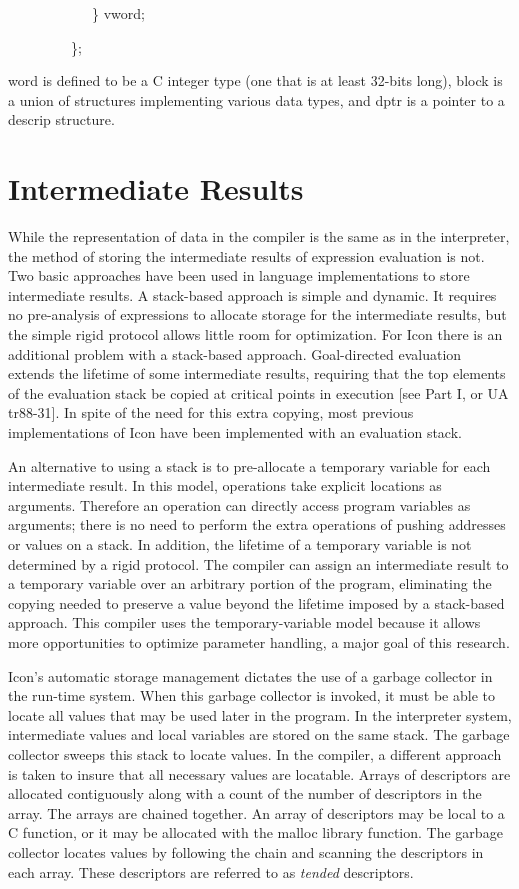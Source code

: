{\ttfamily\mdseries
\ \ \ \ \ \ \ \ \ \ \ \ \} vword;}

{\ttfamily\mdseries
\ \ \ \ \ \ \ \ \ \};}


word is defined to be a C integer type (one that is at least 32-bits long), block is a union of structures implementing
various data types, and dptr is a pointer to a descrip structure. 

\section{Intermediate Results}

While the representation of data in the compiler is the same as in the
interpreter, the method of storing the intermediate results of
expression evaluation is not. Two basic approaches have been used in
language implementations to store intermediate results. A stack-based
approach is simple and dynamic. It requires no pre-analysis of
expressions to allocate storage for the intermediate results, but the
simple rigid protocol allows little room for optimization.  For Icon
there is an additional problem with a stack-based
approach. Goal-directed evaluation extends the lifetime of some
intermediate results, requiring that the top elements of the
evaluation stack be copied at critical points in execution [see Part
I, or UA tr88-31]. In spite of the need for this extra copying, most
previous implementations of Icon have been implemented with an
evaluation stack.

An alternative to using a stack is to pre-allocate a temporary
variable for each intermediate result. In this model, operations take
explicit locations as arguments. Therefore an operation can directly
access program variables as arguments; there is no need to perform the
extra operations of pushing addresses or values on a stack. In
addition, the lifetime of a temporary variable is not determined by a
rigid protocol. The compiler can assign an intermediate result to a
temporary variable over an arbitrary portion of the program,
eliminating the copying needed to preserve a value beyond the lifetime
imposed by a stack-based approach. This compiler uses the
temporary-variable model because it allows more opportunities to
optimize parameter handling, a major goal of this research.


Icon's automatic storage management dictates the use of a garbage
collector in the run-time system. When this garbage collector is
invoked, it must be able to locate all values that may be used later
in the program. In the interpreter system, intermediate values and
local variables are stored on the same stack. The garbage collector
sweeps this stack to locate values. In the compiler, a different
approach is taken to insure that all necessary values are locatable.
Arrays of descriptors are allocated contiguously along with a count of
the number of descriptors in the array. The arrays are chained
together. An array of descriptors may be local to a C function, or it
may be allocated with the malloc library function. The garbage
collector locates values by following the chain and scanning the
descriptors in each array. These descriptors are referred to as
\textit{tended} descriptors.

